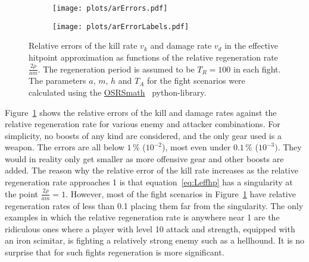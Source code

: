 \begin{figure}[t]
	\centering
	\begin{subfigure}{\textwidth}
		\centering
		\texttt{[image: plots/arErrors.pdf]}
	\end{subfigure}
	\begin{subfigure}{\textwidth}
		\centering
		\texttt{[image: plots/arErrorLabels.pdf]}
	\end{subfigure}
	\caption{Relative errors of the kill rate $v_k$ and damage rate $v_d$ in the effective hitpoint approximation as functions of the relative regeneration rate $\frac{2\rho}{am}$. The regeneration period is assumed to be $T_R=100$ in each fight. The parameters $a$, $m$, $h$ and $T_A$ for the fight scenarios were calculated using the \href{https://github.com/Palfore/OSRSmath}{OSRSmath}~\cite{osrsmath} python-library.}\label{fig:arErrors}
\end{figure}
\FloatBarrier
Figure~\ref{fig:arErrors} shows the relative errors of the kill and damage rates against the relative regeneration rate for various enemy and attacker combinations. For simplicity, no boosts of any kind are considered, and the only gear used is a weapon. The errors are all below $1\,\%$ ($10^{-2}$), most even under $0.1\,\%$ ($10^{-3})$. They would in reality only get smaller as more offensive gear and other boosts are added.
The reason why the relative error of the kill rate increases as the relative regeneration rate approaches 1 is that equation~\ref{eq:Leffhp} has a singularity at the point $\frac{2\rho}{am}=1$. However, most of the fight scenarios in Figure~\ref{fig:arErrors} have relative regeneration rates of less than 0.1 placing them far from the singularity. The only examples in which the relative regeneration rate is anywhere near 1 are the ridiculous ones where a player with level 10 attack and strength, equipped with an iron scimitar, is fighting a relatively strong enemy such as a hellhound. It is no surprise that for such fights regeneration is more significant.
\FloatBarrier
